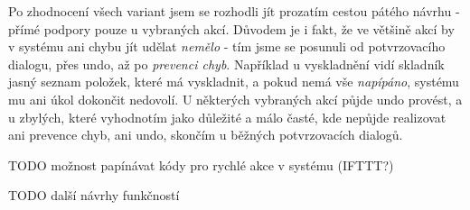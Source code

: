 Po zhodnocení všech variant jsem se rozhodli jít prozatím cestou pátého návrhu - přímé podpory pouze u vybraných akcí. Důvodem je i fakt, že ve většině akcí by v systému ani chybu jít udělat \emph{nemělo} - tím jsme se posunuli od potvrzovacího dialogu, přes undo, až po \emph{prevenci chyb}. Například u vyskladnění vidí skladník jasný seznam položek, které má vyskladnit, a pokud nemá vše \emph{napípáno}, systému mu ani úkol dokončit nedovolí. U některých vybraných akcí půjde undo provést, a u zbylých, které vyhodnotím jako důležité a málo časté, kde nepůjde realizovat ani prevence chyb, ani undo, skončím u běžných potvrzovacích dialogů.

TODO možnost papínávat kódy pro rychlé akce v systému (IFTTT?)

TODO další návrhy funkčností
